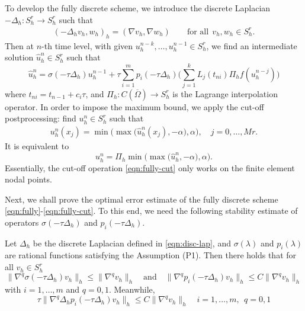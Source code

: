 \documentclass[10pt,final,leqno,onefignum,onetabnum]{siamltex}%
\begin{document}
To develop the fully discrete scheme, we introduce the discrete Laplacian $-\Delta_h: S_h^r\rightarrow S_h^r$ such that
\begin{align}\label{eqn:disc-lap}
(-\Delta_h v_h, w_h)_h = (\nabla v_h, \nabla w_h)\qquad \text{for all} ~~v_h,w_h\in S_h^r.
\end{align}
Then at $n$-th time level, with given $u_h^{n-k}, \ldots, u_h^{n-1} \in S_h^r$, we find an intermediate solution
$\hat u_h^n\in S_h^r$ such that
\begin{equation}\label{eqn:fully}
 \hat u_h^n = \sigma(-\tau \Delta_h) u_h^{n-1} +\tau  \sum_{i=1}^m p_i(-\tau \Delta_h)
 \Big(\sum_{j=1}^{k} L_j (t_{ni}) \Pi_h f(u_h^{n-j})\Big)
\end{equation}
where $t_{ni}=t_{n-1}+c_i\tau$, and $\Pi_h:C(\overline\Omega)\rightarrow S_h^r$ is the Lagrange interpolation operator.
In order to impose the maximum bound, we apply the cut-off postprocessing: find $u_h^n \in S_h^r$ such that
\begin{equation}\label{eqn:fully-cut}
\begin{split}
u_h^n(x_j)  = \min\big(\max \big(\hat u_h^n(x_j), - \alpha \big) , \alpha \big),  \quad j=0,\dots,Mr.
\end{split}
\end{equation}
It is equivalent to
\begin{equation*}
u_h^n  = \Pi_h \min\big(\max \big(\hat u_h^n, - \alpha \big) , \alpha \big) .
\end{equation*}
Essentially, the cut-off operation \eqref{eqn:fully-cut} only works on the finite element nodal points.


Next, we shall prove the optimal error estimate of the fully discrete scheme \eqref{eqn:fully}-\eqref{eqn:fully-cut}.
To this end, we need the following stability estimate of operators $\sigma(-\tau \Delta_h)$ and $p_i(-\tau \Delta_h) $.
\begin{lemma}\label{lem:stable-fully}
Let $\Delta_h$ be the discrete Laplacian defined in \eqref{eqn:disc-lap}, and $\sigma(\lambda)$ and $p_i(\lambda)$ are
rational functions satisfying the Assumption (P1). Then there holds that for all $v_h \in S_h^r$
\begin{equation}\label{eqn:stab-est-1}
 \|  \nabla^q \sigma(-\tau \Delta_h) v_h \|_h \le \| \nabla^q v_h \|_h
\quad \text{and}\quad \|  \nabla^q p_i(-\tau \Delta_h ) v_h \|_h \le C\| \nabla^q v_h \|_h
 \end{equation}
 with $i=1,\ldots,m$ and $q=0,1$.
 Meanwhile,
\begin{equation} \label{eqn:stab-est-2}
 \tau \|  \nabla^q \Delta_h p_i (-\tau \Delta_h) v_h \|_h   \le C \|  \nabla^q v_h \|_h
 \quad  i=1,\ldots,m, ~~q=0,1
  \end{equation}
\end{lemma}
\end{document}
